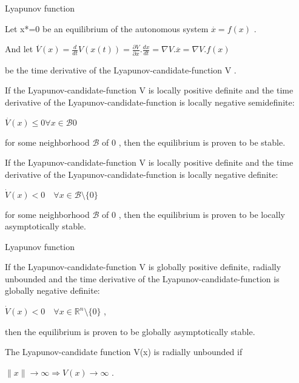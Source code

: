 \documentclass{beamer}
\begin{document}
\begin{frame}{Lyapunov function}

Let x*=0
  be an equilibrium of the autonomous system $\overset{.}{x}=f\left(x\right)$
 .

And let $\overset{.}{V}\left(x\right)=\frac{d}{dt}V\left(x\left(t\right)\right)=\frac{\partial V}{\partial x}.\frac{dx}{dt}=\nabla V.\overset{.}{x}=\nabla V.f\left(x\right)$
 

be the time derivative of the Lyapunov-candidate-function V
 .

If the Lyapunov-candidate-function V
  is locally positive definite and the time derivative of the Lyapunov-candidate-function is locally negative semidefinite:

$\overset{.}{V}\left(x\right)\leq0
  \forall x\in\mathcal{B}{0}$
 

for some neighborhood $\mathcal{B}$
  of 0
 , then the equilibrium is proven to be stable.

If the Lyapunov-candidate-function V
  is locally positive definite and the time derivative of the Lyapunov-candidate-function is locally negative definite:

$\dot{V}(x)<0\quad\forall x\in\mathcal{B}\setminus\{0\}$
 

for some neighborhood $\mathcal{B}$
  of 0
 , then the equilibrium is proven to be locally asymptotically stable.
\end{frame}

\begin{frame}{Lyapunov function}

If the Lyapunov-candidate-function V
  is globally positive definite, radially unbounded and the time derivative of the Lyapunov-candidate-function is globally negative definite:

$\dot{V}(x)<0\quad\forall x\in\mathbb{R}^{n}\setminus\{0\}$
 ,

then the equilibrium is proven to be globally asymptotically stable.

The Lyapunov-candidate function V(x)
  is radially unbounded if

$\|x\|\to\infty\Rightarrow V(x)\to\infty$
 . 

\end{frame}
\end{document}
